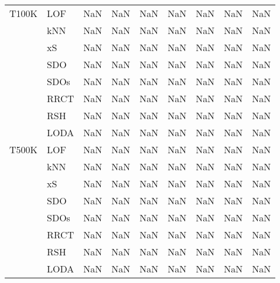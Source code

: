\begin{table}
\begin{tabular}{lllllllll}
T100K & LOF &          NaN &          NaN &          NaN &          NaN &          NaN &          NaN &          NaN \\
      & kNN &          NaN &          NaN &          NaN &          NaN &          NaN &          NaN &          NaN \\
      & xS &          NaN &          NaN &          NaN &          NaN &          NaN &          NaN &          NaN \\
      & SDO &          NaN &          NaN &          NaN &          NaN &          NaN &          NaN &          NaN \\
      & SDOs &          NaN &          NaN &          NaN &          NaN &          NaN &          NaN &          NaN \\
      & RRCT &          NaN &          NaN &          NaN &          NaN &          NaN &          NaN &          NaN \\
      & RSH &          NaN &          NaN &          NaN &          NaN &          NaN &          NaN &          NaN \\
      & LODA &          NaN &          NaN &          NaN &          NaN &          NaN &          NaN &          NaN \\
T500K & LOF &          NaN &          NaN &          NaN &          NaN &          NaN &          NaN &          NaN \\
      & kNN &          NaN &          NaN &          NaN &          NaN &          NaN &          NaN &          NaN \\
      & xS &          NaN &          NaN &          NaN &          NaN &          NaN &          NaN &          NaN \\
      & SDO &          NaN &          NaN &          NaN &          NaN &          NaN &          NaN &          NaN \\
      & SDOs &          NaN &          NaN &          NaN &          NaN &          NaN &          NaN &          NaN \\
      & RRCT &          NaN &          NaN &          NaN &          NaN &          NaN &          NaN &          NaN \\
      & RSH &          NaN &          NaN &          NaN &          NaN &          NaN &          NaN &          NaN \\
      & LODA &          NaN &          NaN &          NaN &          NaN &          NaN &          NaN &          NaN \\
\bottomrule
\end{tabular}
\end{table}
